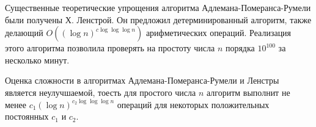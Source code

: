   Существенные теоретические упрощения алгоритма Адлемана-Померанса-Румели были получены Х. Ленстрой. Он предложил
детерминированный алгоритм, также делающий $O((\log n)^{c \log \log \log n})$ арифметических операций. Реализация этого алгоритма позволила
проверять на простоту числа $n$ порядка $10^{100}$ за несколько минут. 

  Оценка сложности в алгоритмах Адлемана-Померанса-Румели и Ленстры является неулучшаемой, тоесть для простого
числа $n$ алгоритм выполнит не менее $c_{1} (\log n)^{c_2 \log \log \log n}$ операций для некоторых положительных постоянных $c_1$ и $c_2$.